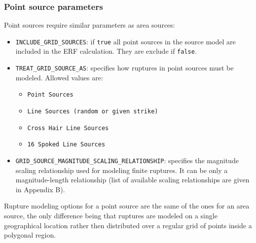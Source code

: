 \subsubsection{Point source parameters}
Point sources require similar parameters as area sources:
\begin{itemize}
\item \Verb+INCLUDE_GRID_SOURCES+: if \Verb+true+ all point sources in the source model are included in the ERF calculation. They are exclude if \Verb+false+.
\item \Verb+TREAT_GRID_SOURCE_AS+: specifies how ruptures in point sources must be modeled. Allowed values are:
\begin{itemize}
\item \Verb+Point Sources+
\item \Verb+Line Sources (random or given strike)+
\item \Verb+Cross Hair Line Sources+
\item \Verb+16 Spoked Line Sources+
\end{itemize}
\item \Verb+GRID_SOURCE_MAGNITUDE_SCALING_RELATIONSHIP+: specifies the magnitude scaling relationship used for modeling finite ruptures. It can be only a magnitude-length relationship (list of available scaling relationships are given in Appendix B).
\end{itemize}
Rupture modeling options for a point source are the same of the ones for an area source, the only difference being that ruptures are modeled on a single geographical location rather then distributed over a regular grid of points inside a polygonal region. 

